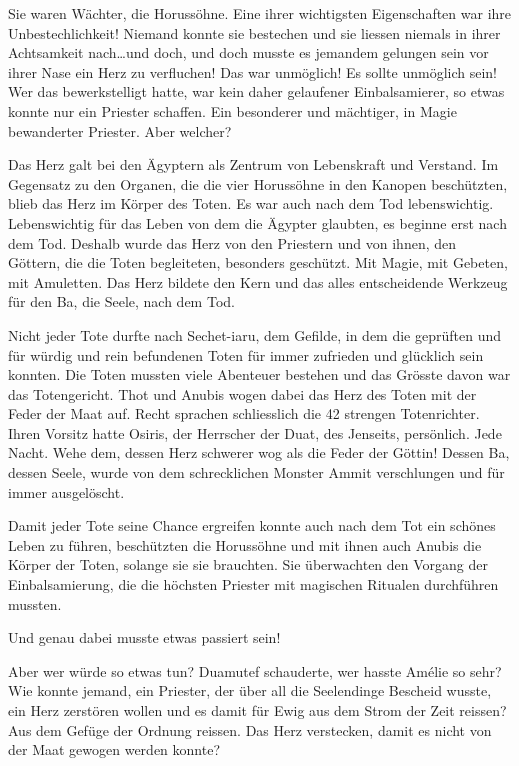 \documentclass[11pt,titlepage,a5paper]{book}
\begin{document}
Sie waren Wächter, die Horussöhne. Eine ihrer wichtigsten Eigenschaften war ihre Unbestechlichkeit! Niemand konnte sie bestechen und sie liessen niemals in ihrer Achtsamkeit nach\dots und doch, und doch musste es jemandem gelungen sein vor ihrer Nase ein Herz zu verfluchen! Das war unmöglich! Es sollte unmöglich sein! Wer das bewerkstelligt hatte, war kein daher gelaufener Einbalsamierer, so etwas konnte nur ein Priester schaffen. Ein besonderer und mächtiger, in Magie bewanderter Priester. Aber welcher?

Das Herz galt bei den Ägyptern als Zentrum von Lebenskraft und Verstand. Im Gegensatz zu den Organen, die die vier Horussöhne in den Kanopen beschützten, blieb das Herz im Körper des Toten. Es war auch nach dem Tod lebenswichtig. Lebenswichtig für das Leben von dem die Ägypter glaubten, es beginne erst nach dem Tod. Deshalb wurde das Herz von den Priestern und von ihnen, den Göttern, die die Toten begleiteten, besonders geschützt. Mit Magie, mit Gebeten, mit Amuletten. Das Herz bildete den Kern und das alles entscheidende Werkzeug für den Ba, die Seele, nach dem Tod.

Nicht jeder Tote durfte nach Sechet-iaru, dem Gefilde, in dem die geprüften und für würdig und rein befundenen Toten für immer zufrieden und glücklich sein konnten. Die Toten mussten viele Abenteuer bestehen und das Grösste davon war das Totengericht. Thot und Anubis wogen dabei das Herz des Toten mit der Feder der Maat auf. Recht sprachen schliesslich die 42 strengen Totenrichter. Ihren Vorsitz hatte Osiris, der Herrscher der Duat, des Jenseits, persönlich. Jede Nacht. Wehe dem, dessen Herz schwerer wog als die Feder der Göttin! Dessen Ba, dessen Seele, wurde von dem schrecklichen Monster Ammit verschlungen und für immer ausgelöscht.

Damit jeder Tote seine Chance ergreifen konnte auch nach dem Tot ein schönes Leben zu führen, beschützten die Horussöhne und mit ihnen auch Anubis die Körper der Toten, solange sie sie brauchten. Sie überwachten den Vorgang der Einbalsamierung, die die höchsten Priester mit magischen Ritualen durchführen mussten.

Und genau dabei musste etwas passiert sein!

Aber wer würde so etwas tun? Duamutef schauderte, wer hasste Amélie so sehr? Wie konnte jemand, ein Priester, der über all die Seelendinge Bescheid wusste, ein Herz zerstören wollen und es damit für Ewig aus dem Strom der Zeit reissen? Aus dem Gefüge der Ordnung reissen. Das Herz verstecken, damit es nicht von der Maat gewogen werden konnte? 
\end{document}
